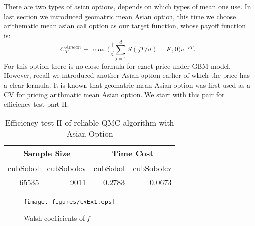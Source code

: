 There are two types of asian options, depends on which types of mean one use. 
In last section we introduced geomatric mean Asian option, this time we choose arithematic mean asian call option as our target function, whose payoff function is:
\[ C_{T}^{Amean} = \max\Big(\frac{1}{d}\sum_{j=1}^{d}S(jT/d)-K, 0\Big)e^{-rT}.\]
For this option there is no close formula for exact price under GBM model.
However, recall we introduced another Asian option earlier of which the price has a clear formula. 
It is known that geomatric mean Asian option was first used as a CV for pricing arithmatic mean Asian option\cite{kemna1990pricing}.  
We start with this pair for efficiency test part II.

\begin{table}[h]
    \centering
    \label{tb:efftest2a}
	\caption{Efficiency test II of reliable QMC algorithm with Asian Option}
    \begin{tabular}{rrrr}  
    \hline\hline
	\multicolumn{2}{c}{Sample Size}
		&\multicolumn{2}{c}{Time Cost} \\
    \hline
	 cubSobol&cubSobolcv
    &cubSobol&cubSobolcv\\[0.5ex]
    \hline
		 65535&9011
    &0.2783&0.0673\\[1ex]
    \hline
	\end{tabular}
\end{table}


\begin{figure}[h]
    \centering
    \texttt{[image: figures/cvEx1.eps]}
    \label{fg:cvEX1}
    \caption{Walsh coefficients of $f$}
\end{figure}

